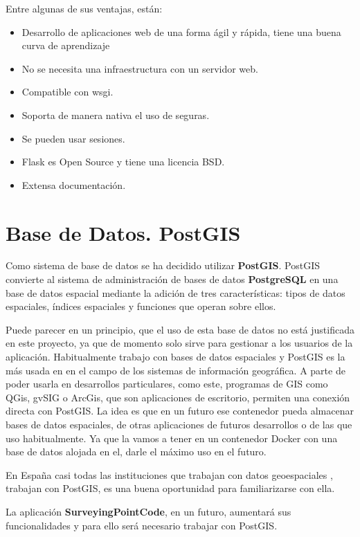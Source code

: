 Entre algunas de sus ventajas, están:
\begin{itemize}
\item Desarrollo de aplicaciones web de una forma ágil y rápida, tiene una buena curva de aprendizaje
\item No se necesita una infraestructura con un servidor web.
\item Compatible con wsgi.
\item Soporta de manera nativa el uso de  seguras.
\item Se pueden usar sesiones.
\item Flask es Open Source y tiene una licencia BSD.
\item Extensa documentación.
\end{itemize}

\section{Base de Datos. PostGIS}\label{sec:postgis}

Como sistema de base de datos se ha decidido utilizar \textbf{PostGIS}. PostGIS convierte al sistema de administración de bases de datos \textbf{PostgreSQL} en una base de datos espacial mediante la adición de tres características: tipos de datos espaciales, índices espaciales y funciones que operan sobre ellos.

Puede parecer en un principio, que el uso de esta base de datos no está justificada en este proyecto, ya que de momento solo sirve para gestionar a los usuarios de la aplicación. Habitualmente trabajo con bases de datos espaciales y PostGIS es la más usada en en el campo de los sistemas de información geográfica. A parte de poder usarla en desarrollos particulares, como este, programas de GIS como QGis, gvSIG o ArcGis, que son aplicaciones de escritorio,  permiten una conexión directa con PostGIS. 
La idea es que en un futuro ese contenedor pueda almacenar bases de datos espaciales, de otras aplicaciones de futuros desarrollos o de las que uso habitualmente. Ya que la vamos a tener en un contenedor Docker con una base de datos alojada en el, darle el máximo uso en el futuro.

En España casi todas las instituciones que trabajan con datos geoespaciales , trabajan con PostGIS, es una buena oportunidad para familiarizarse con ella.

La aplicación \textbf{SurveyingPointCode}, en un futuro, aumentará sus funcionalidades y para ello será necesario trabajar con PostGIS.

